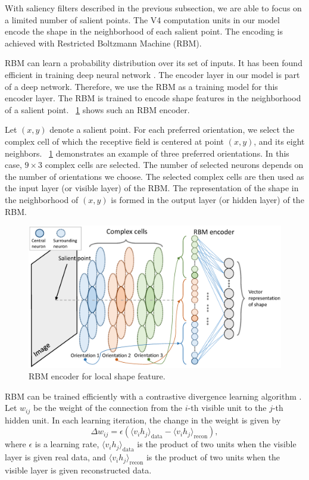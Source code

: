 \documentclass[10pt]{article}
\begin{document}
With saliency filters described in the previous subsection,
we are able to focus on a limited number of salient points.
The V4 computation units in our model encode the shape in the neighborhood of each salient point.
The encoding is achieved with Restricted Boltzmann Machine (RBM).

RBM can learn a probability distribution over its set of inputs.
It has been found efficient in training deep neural network \cite{hinton2006}.
The encoder layer in our model is part of a deep network.
Therefore, we use the RBM as a training model for this encoder layer.
The RBM is trained to encode shape features in the neighborhood of a salient point.
\figurename~\ref{fig:6} shows such an RBM encoder.


Let $(x,y)$ denote a salient point.
For each preferred orientation, 
we select the complex cell of which the receptive field is centered at point $(x,y)$,
and its eight neighbors.
\figurename~\ref{fig:6} demonstrates an example of three preferred orientations.
In this case, $9\times3$ complex cells are selected.
The number of selected neurons depends on the number of orientations we choose.
The selected complex cells are then used as the input layer (or visible layer) of the RBM.
The representation of the shape in the neighborhood of $(x,y)$
is formed in the output layer (or hidden layer) of the RBM.

\begin{figure}
\centerline{\includegraphics[width=0.99\linewidth]{images/fig-6.eps}} 
\caption{RBM encoder for local shape feature.}
\label{fig:6}
\end{figure}

RBM can be trained efficiently with a contrastive divergence learning algorithm \cite{hinton2002}.
Let $w_{ij}$ be the weight of the connection from the $i$-th visible unit to the $j$-th hidden unit.
In each learning iteration, the change in the weight is given by
\begin{equation}
\Delta w_{ij}=\epsilon\left(\langle v_i h_j\rangle_\text{data}-\langle v_i h_j\rangle_\text{recon}\right),
\end{equation}
where $\epsilon$ is a learning rate, 
$\langle v_i h_j\rangle_\text{data}$ is the product of two units when the visible layer is given real data,
and $\langle v_i h_j\rangle_\text{recon}$ is the product of two units 
when the visible layer is given reconstructed data.
\end{document}
